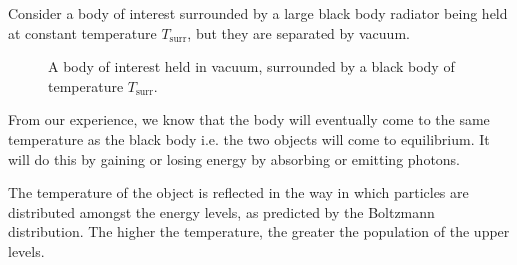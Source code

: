 \documentclass{article}
\theoremstyle{plain}\theoremheaderfont{\normalfont\itshape}\theorembodyfont{\rmfamily}\theoremseparator{.}\newtheorem*{rem}{Remark}\newtheorem*{ex}{Example}\newtheorem*{proof}{Proof}\newtheorem*{altp}{Alternative proof}
\theoremstyle{plain}\theoremheaderfont{\normalfont\bfseries}\theorembodyfont{\rmfamily}\theoremseparator{.}\newtheorem{thm}{Theorem}[section]\newtheorem{lem}[thm]{Lemma}\newtheorem{prop}[thm]{Proposition}\newtheorem*{cor}{Corollary}\newtheorem{defn}[thm]{Definition}\newtheorem{clm}[thm]{Claim}\newtheorem{clminproof}{Claim}\newtheorem{pos}{Postulate}[section]
\theoremstyle{break}\theoremheaderfont{\normalfont\itshape}\theorembodyfont{\rmfamily}\theoremseparator{.\medskip}\newtheorem*{proofskip}{Proof}\newtheorem*{exs}{Examples}\newtheorem*{rems}{Remarks}
\theoremstyle{break}\theoremheaderfont{\normalfont\bfseries}\theorembodyfont{\rmfamily}\theoremseparator{.\medskip}\newtheorem{lemskip}[thm]{Lemma}\newtheorem{defnskip}[thm]{Definition}\newtheorem{propskip}[thm]{Proposition}\newtheorem{thmskip}[thm]{Theorem}
\numberwithin{equation}{section}
\begin{document}
    Consider a body of interest surrounded by a large black body radiator being held at constant temperature \(T_{\text{surr}}\), but they are separated by vacuum.

    \begin{figure}[ht!]
        \centering
        \caption{A body of interest held in vacuum, surrounded by a black body of temperature \(T_{\text{surr}}\).}
    \end{figure}

    From our experience, we know that the body will eventually come to the same temperature as the black body i.e. the two objects will come to equilibrium. It will do this by gaining or losing energy by absorbing or emitting photons.

    The temperature of the object is reflected in the way in which particles are distributed amongst the energy levels, as predicted by the Boltzmann distribution. The higher the temperature, the greater the population of the upper levels.
\end{document}
